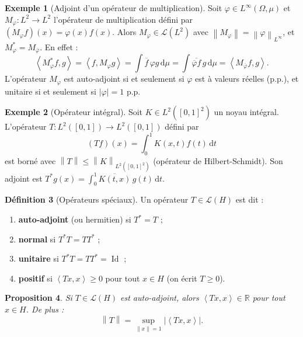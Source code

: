 \documentclass[a4paper,12pt]{book}
\DeclareMathOperator{\Id}{Id}
\newcommand{\R}{\mathbb{R}}
\newcommand{\dd}{\mathrm{d}}
\newcommand{\norm}[1]{\left\| #1 \right\|}
\newcommand{\abs}[1]{\left| #1 \right|}
\newcommand{\inner}[2]{\left\langle #1, #2 \right\rangle}
\theoremstyle{definition}
\newtheorem{definition}{Définition}[chapter]
\newtheorem{exemple}[definition]{Exemple}
\theoremstyle{plain}
\newtheorem{proposition}[definition]{Proposition}
\theoremstyle{remark}
\begin{document}
\begin{exemple}[Adjoint d'un opérateur de multiplication]\label{ex:adjoint-multiplication}
Soit $\varphi \in L^\infty(\Omega, \mu)$ et $M_\varphi : L^2 \to L^2$ l'opérateur de multiplication défini par $(M_\varphi f)(x) = \varphi(x)f(x)$. Alors $M_\varphi \in \mathcal{L}(L^2)$ avec $\norm{M_\varphi} = \norm{\varphi}_{L^\infty}$, et $M_\varphi^* = M_{\overline{\varphi}}$. En effet :
\[
    \inner{M_\varphi^* f}{g} = \inner{f}{M_\varphi g} = \int \overline{f}\,\varphi g\,\dd\mu = \int \overline{\overline{\varphi}f}\,g\,\dd\mu = \inner{M_{\overline{\varphi}}f}{g}.
\]
L'opérateur $M_\varphi$ est auto-adjoint si et seulement si $\varphi$ est à valeurs réelles (p.p.), et unitaire si et seulement si $\abs{\varphi} = 1$ p.p.
\end{exemple}

\begin{exemple}[Opérateur intégral]\label{ex:operateur-integral}
Soit $K \in L^2([0,1]^2)$ un noyau intégral. L'opérateur $T : L^2([0,1]) \to L^2([0,1])$ défini par
\[
    (Tf)(x) = \int_0^1 K(x,t)f(t)\,\dd t
\]
est borné avec $\norm{T} \leq \norm{K}_{L^2([0,1]^2)}$ (opérateur de Hilbert-Schmidt). Son adjoint est $T^*g(x) = \int_0^1 \overline{K(t,x)}\,g(t)\,\dd t$.
\end{exemple}

\begin{definition}[Opérateurs spéciaux]\label{def:op-speciaux}
Un opérateur $T \in \mathcal{L}(H)$ est dit :
\begin{enumerate}[label=(\roman*)]
    \item \textbf{auto-adjoint} (ou hermitien) si $T^* = T$ ;
    \item \textbf{normal} si $T^*T = TT^*$ ;
    \item \textbf{unitaire} si $T^*T = TT^* = \Id$ ;
    \item \textbf{positif} si $\inner{Tx}{x} \geq 0$ pour tout $x \in H$ (on écrit $T \geq 0$).
\end{enumerate}
\end{definition}

\begin{proposition}\label{prop:auto-adjoint-reel}
Si $T \in \mathcal{L}(H)$ est auto-adjoint, alors $\inner{Tx}{x} \in \R$ pour tout $x \in H$. De plus :
\[
    \norm{T} = \sup_{\norm{x}=1} \abs{\inner{Tx}{x}}.
\]
\end{proposition}
\end{document}
